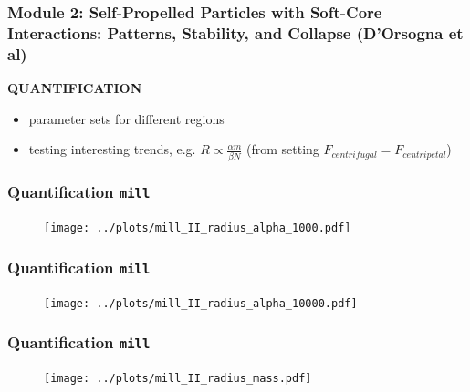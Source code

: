 \documentclass[compress]{beamer}
\begin{document}
\begin{frame}
  \frametitle{Module 2: Self-Propelled Particles with Soft-Core Interactions: Patterns, Stability, and Collapse (D'Orsogna et al)}
	
	\textbf{QUANTIFICATION}
	
\begin{itemize}
	\item parameter sets for different regions
	\item testing interesting trends, e.g. \( R \propto \frac{\alpha m}{\beta N}\) (from setting \( F_{centrifugal} = F_{centripetal} \))

	
\end{itemize}
	
\end{frame}


\begin{frame}
	\frametitle{Quantification \texttt{mill}}
\begin{figure}[H]
	\texttt{[image: ../plots/mill\_II\_radius\_alpha\_1000.pdf]}
\end{figure}
\end{frame}

\begin{frame}
	\frametitle{Quantification \texttt{mill}}
	\begin{figure}[H]
		\texttt{[image: ../plots/mill\_II\_radius\_alpha\_10000.pdf]}
	\end{figure}
\end{frame}

\begin{frame}
	\frametitle{Quantification \texttt{mill}}
	\begin{figure}[H]
		\texttt{[image: ../plots/mill\_II\_radius\_mass.pdf]}
	\end{figure}
\end{frame}
\end{document}
